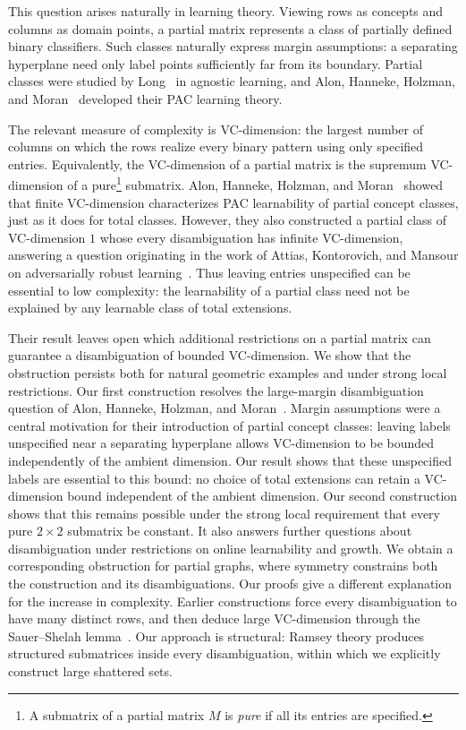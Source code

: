 \documentclass[11pt]{article}
\theoremstyle{remark}
\begin{document}
This question arises naturally in learning theory.
Viewing rows as concepts and columns as domain points, a partial matrix represents a class of partially defined binary classifiers.
Such classes naturally express margin assumptions: a separating hyperplane need only label points sufficiently far from its boundary.
Partial classes were studied by Long~\cite{L01} in agnostic learning, and Alon, Hanneke, Holzman, and Moran~\cite{AHHM22} developed their PAC learning theory.

The relevant measure of complexity is VC-dimension: the largest number of columns on which the rows realize every binary pattern using only specified entries.
Equivalently, the VC-dimension of a partial matrix is the supremum VC-dimension of a pure\footnote{A submatrix of a partial matrix $M$ is \emph{pure} if all its entries are specified.} submatrix.
Alon, Hanneke, Holzman, and Moran~\cite{AHHM22} showed that finite VC-dimension characterizes PAC learnability of partial concept classes, just as it does for total classes.
However, they also constructed a partial class of VC-dimension $1$ whose every disambiguation has infinite VC-dimension, answering a question originating in the work of Attias, Kontorovich, and Mansour on adversarially robust learning~\cite{AKM22}.
Thus leaving entries unspecified can be essential to low complexity: the learnability of a partial class need not be explained by any learnable class of total extensions.

\smallskip

Their result leaves open which additional restrictions on a partial matrix can guarantee a disambiguation of bounded VC-dimension.
We show that the obstruction persists both for natural geometric examples and under strong local restrictions.
Our first construction resolves the large-margin disambiguation question of Alon, Hanneke, Holzman, and Moran~\cite{AHHM22}.
Margin assumptions were a central motivation for their introduction of partial concept classes: leaving labels unspecified near a separating hyperplane allows VC-dimension to be bounded independently of the ambient dimension.
Our result shows that these unspecified labels are essential to this bound: no choice of total extensions can retain a VC-dimension bound independent of the ambient dimension.
Our second construction shows that this remains possible under the strong local requirement that every pure $2\times2$ submatrix be constant.
It also answers further questions about disambiguation under restrictions on online learnability and growth.
We obtain a corresponding obstruction for partial graphs, where symmetry constrains both the construction and its disambiguations.
Our proofs give a different explanation for the increase in complexity.
Earlier constructions force every disambiguation to have many distinct rows, and then deduce large VC-dimension through the Sauer--Shelah lemma~\cite{AHHM22,CHHH23}.
Our approach is structural: Ramsey theory produces structured submatrices inside every disambiguation, within which we explicitly construct large shattered sets.
\end{document}
